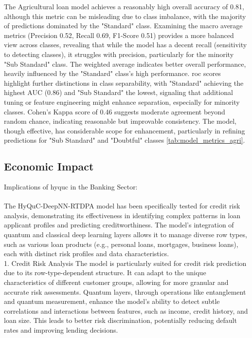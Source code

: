 \documentclass[a4paper]{article}
\begin{document}
\noindent The Agricultural loan model achieves a reasonably high overall accuracy of 0.81, although this metric can be misleading due to class imbalance, with the majority of predictions dominated by the "Standard" class. Examining the macro average metrics (Precision 0.52, Recall 0.69, F1-Score 0.51) provides a more balanced view across classes, revealing that while the model has a decent recall (sensitivity to detecting classes), it struggles with precision, particularly for the minority "Sub Standard" class. The weighted average indicates better overall performance, heavily influenced by the "Standard" class’s high performance. \gls{roc} scores highlight further distinctions in class separability, with "Standard" achieving the highest AUC (0.86) and "Sub Standard" the lowest, signaling that additional tuning or feature engineering might enhance separation, especially for minority classes. Cohen's Kappa score of 0.46 suggests moderate agreement beyond random chance, indicating reasonable but improvable consistency. The model, though effective, has considerable scope for enhancement, particularly in refining predictions for "Sub Standard" and "Doubtful" classes \ref{tab:model_metrics_agri}.
\subsection{Economic Impact}
Implications of \gls{hyquc} in the Banking Sector:\\\\
The HyQuC-DeepNN-RTDPA model has been specifically tested for credit risk analysis, demonstrating its effectiveness in identifying complex patterns in loan applicant profiles and predicting creditworthiness. The model’s integration of quantum and classical deep learning layers allows it to manage diverse row types, such as various loan products (e.g., personal loans, mortgages, business loans), each with distinct risk profiles and data characteristics.\\

1. Credit Risk Analysis
The model is particularly suited for credit risk prediction due to its row-type-dependent structure. It can adapt to the unique characteristics of different customer groups, allowing for more granular and accurate risk assessments. Quantum layers, through operations like entanglement and quantum measurement, enhance the model’s ability to detect subtle correlations and interactions between features, such as income, credit history, and loan size. This leads to better risk discrimination, potentially reducing default rates and improving lending decisions.\\
\end{document}
